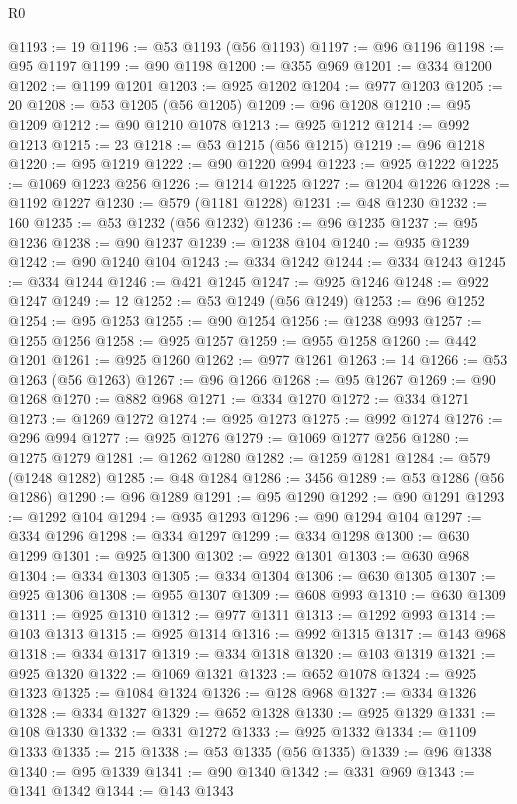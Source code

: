 \begin{lexlean}{R0}
\begin{coremodule}
@1193 := 19
@1196 := @53 @1193 (@56 @1193)
@1197 := @96 @1196
@1198 := @95 @1197
@1199 := @90 @1198
@1200 := @355 @969
@1201 := @334 @1200
@1202 := @1199 @1201
@1203 := @925 @1202
@1204 := @977 @1203
@1205 := 20
@1208 := @53 @1205 (@56 @1205)
@1209 := @96 @1208
@1210 := @95 @1209
@1212 := @90 @1210 @1078
@1213 := @925 @1212
@1214 := @992 @1213
@1215 := 23
@1218 := @53 @1215 (@56 @1215)
@1219 := @96 @1218
@1220 := @95 @1219
@1222 := @90 @1220 @994
@1223 := @925 @1222
@1225 := @1069 @1223 @256
@1226 := @1214 @1225
@1227 := @1204 @1226
@1228 := @1192 @1227
@1230 := @579 (@1181 @1228)
@1231 := @48 @1230
@1232 := 160
@1235 := @53 @1232 (@56 @1232)
@1236 := @96 @1235
@1237 := @95 @1236
@1238 := @90 @1237
@1239 := @1238 @104
@1240 := @935 @1239
@1242 := @90 @1240 @104
@1243 := @334 @1242
@1244 := @334 @1243
@1245 := @334 @1244
@1246 := @421 @1245
@1247 := @925 @1246
@1248 := @922 @1247
@1249 := 12
@1252 := @53 @1249 (@56 @1249)
@1253 := @96 @1252
@1254 := @95 @1253
@1255 := @90 @1254
@1256 := @1238 @993
@1257 := @1255 @1256
@1258 := @925 @1257
@1259 := @955 @1258
@1260 := @442 @1201
@1261 := @925 @1260
@1262 := @977 @1261
@1263 := 14
@1266 := @53 @1263 (@56 @1263)
@1267 := @96 @1266
@1268 := @95 @1267
@1269 := @90 @1268
@1270 := @882 @968
@1271 := @334 @1270
@1272 := @334 @1271
@1273 := @1269 @1272
@1274 := @925 @1273
@1275 := @992 @1274
@1276 := @296 @994
@1277 := @925 @1276
@1279 := @1069 @1277 @256
@1280 := @1275 @1279
@1281 := @1262 @1280
@1282 := @1259 @1281
@1284 := @579 (@1248 @1282)
@1285 := @48 @1284
@1286 := 3456
@1289 := @53 @1286 (@56 @1286)
@1290 := @96 @1289
@1291 := @95 @1290
@1292 := @90 @1291
@1293 := @1292 @104
@1294 := @935 @1293
@1296 := @90 @1294 @104
@1297 := @334 @1296
@1298 := @334 @1297
@1299 := @334 @1298
@1300 := @630 @1299
@1301 := @925 @1300
@1302 := @922 @1301
@1303 := @630 @968
@1304 := @334 @1303
@1305 := @334 @1304
@1306 := @630 @1305
@1307 := @925 @1306
@1308 := @955 @1307
@1309 := @608 @993
@1310 := @630 @1309
@1311 := @925 @1310
@1312 := @977 @1311
@1313 := @1292 @993
@1314 := @103 @1313
@1315 := @925 @1314
@1316 := @992 @1315
@1317 := @143 @968
@1318 := @334 @1317
@1319 := @334 @1318
@1320 := @103 @1319
@1321 := @925 @1320
@1322 := @1069 @1321
@1323 := @652 @1078
@1324 := @925 @1323
@1325 := @1084 @1324
@1326 := @128 @968
@1327 := @334 @1326
@1328 := @334 @1327
@1329 := @652 @1328
@1330 := @925 @1329
@1331 := @108 @1330
@1332 := @331 @1272
@1333 := @925 @1332
@1334 := @1109 @1333
@1335 := 215
@1338 := @53 @1335 (@56 @1335)
@1339 := @96 @1338
@1340 := @95 @1339
@1341 := @90 @1340
@1342 := @331 @969
@1343 := @1341 @1342
@1344 := @143 @1343

\end{coremodule}
\end{lexlean}
